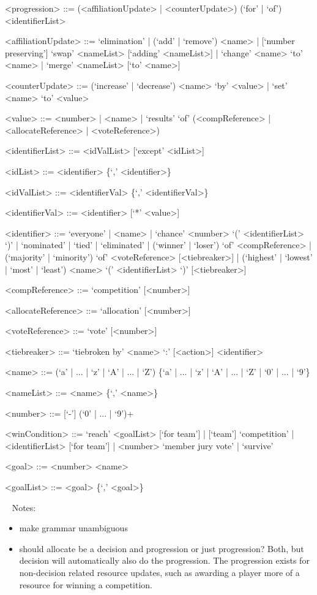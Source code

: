 \documentclass{article}
\begin{document}
\begin{grammar}
<progression> ::= (<affiliationUpdate> | <counterUpdate>) (`for' | `of') 
<identifierList>

<affiliationUpdate> ::= `elimination' | (`add' | `remove') <name> | 
[`number preserving'] `swap' <nameList> [`adding' <nameList>] | `change' <name> 
`to' <name> | `merge' <nameList> [`to' <name>]

<counterUpdate> ::= (`increase' | `decrease') <name> `by' <value> | `set' 
<name> `to' <value> 

<value> ::= <number> | <name> | `results' `of' (<compReference> | 
<allocateReference> |
<voteReference>) %

<identifierList> ::= <idValList> [`except' <idList>]

<idList> ::= <identifier> \{`,' <identifier>\}

<idValList> ::= <identifierVal> \{`,' <identifierVal>\}

<identifierVal> ::= <identifier> [`*' <value>]

<identifier> ::= `everyone' | <name> | `chance'  <number> `(' <identifierList> 
`)' | 
`nominated' 
| 
`tied' | 
`eliminated' | (`winner' | `loser') `of' <compReference> | (`majority' | 
`minority') `of' <voteReference>  [<tiebreaker>] | (`highest' | `lowest' | 
`most' | `least') <name> `(' <identifierList> `)' [<tiebreaker>]

<compReference> ::= `competition' [<number>] 

<allocateReference> ::= `allocation' [<number>]

<voteReference> ::= `vote' [<number>]

<tiebreaker> ::= `tiebroken by' <name> `:' [<action>] <identifier>

<name> ::= (`a' | ... | `z' | `A' | ... | `Z') \{`a' | ... | `z' | `A' | ... | 
`Z' | `0' | ... | `9'\}

<nameList> ::= <name> \{`,' <name>\}

<number> ::= [`-'] (`0' | ... | `9')+

<winCondition> ::= `reach' <goalList> [`for team']  | [`team'] 
`competition' | <identifierList> [`for team'] | 
<number> `member jury vote' | `survive'

<goal> ::= <number> <name>

<goalList> ::= <goal> \{`,' <goal>\}

\end{grammar}

~\newline
Notes:
\begin{itemize}
	\item make grammar unambiguous
	\item should allocate be a decision and progression or just progression? 
	Both, but decision will automatically also do the progression. The 
	progression exists for non-decision related resource updates, such as 
	awarding a player more of a resource for winning a competition.
\end{itemize}
\end{document}

